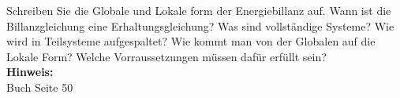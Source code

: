 \begin{question}[section=2,subsection=23,name={Energiebillanz in der Feldphysik},difficulty=5,type=mdl,mode=exm,tags={}]
	Schreiben Sie die Globale und Lokale form der Energiebillanz auf. Wann ist die Billanzgleichung eine Erhaltungsgleichung? Was sind vollständige Systeme? Wie wird in Teilsysteme aufgespaltet? Wie kommt man von der Globalen auf die Lokale Form? Welche Vorraussetzungen müssen dafür erfüllt sein? 
	\\ \textbf{Hinweis:}\\
	Buch Seite 50
\end{question}
\begin{solution}
	
\end{solution}